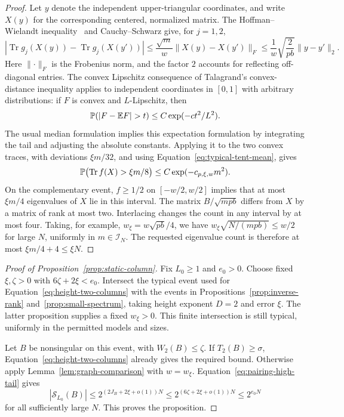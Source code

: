 \begin{proof}
Let \(y\) denote the independent upper-triangular coordinates, and
write \(X(y)\) for the corresponding centered, normalized matrix.
The Hoffman--Wielandt inequality~\cite[Theorem~1]{HoffmanWielandt}
and Cauchy--Schwarz give, for \(j=1,2\),
\[
 \left|\operatorname{Tr}g_j(X(y))-
             \operatorname{Tr}g_j(X(y'))\right|
 \le\frac{\sqrt m}{w}\lVert X(y)-X(y')\rVert_F
 \le\frac1w\sqrt{\frac2{pb}}\lVert y-y'\rVert_2.
\]
Here \(\lVert\cdot\rVert_F\) is the Frobenius norm, and the factor
\(2\) accounts for reflecting off-diagonal entries. The convex Lipschitz
consequence of Talagrand's convex-distance inequality
\cite[Theorem~4.1.1]{Talagrand} applies to independent coordinates in
\([0,1]\) with arbitrary distributions: if \(F\) is
convex and \(L\)-Lipschitz, then
\[
 \Prob(|F-\E F|>t)\le C\exp(-ct^2/L^2).
\]
The usual median formulation implies this expectation formulation by
integrating the tail and adjusting the absolute constants. Applying it
to the two convex traces, with deviations \(\xi m/32\), and using
Equation~\eqref{eq:typical-tent-mean}, gives
\[
 \mathbb P\bigl(\operatorname{Tr}f(X)>\xi m/8\bigr)
 \le C\exp(-c_{p,\xi,w}m^2).
\]
On the complementary event, \(f\ge1/2\) on \([-w/2,w/2]\) implies
that at most \(\xi m/4\) eigenvalues of \(X\) lie in this interval.
The matrix \(B/\sqrt{mpb}\) differs from \(X\) by a matrix of rank
at most two. Interlacing changes the count in any interval by at most
four. Taking, for example, \(w_\xi=w\sqrt{pb}/4\), we have
\(w_\xi\sqrt{N/(mpb)}\le w/2\) for large \(N\), uniformly in
\(m\in\mathcal I_N\). The requested eigenvalue count is therefore
at most \(\xi m/4+4\le\xi N\).
\end{proof}


\begin{proof}[Proof of Proposition~\ref{prop:static-column}]
Fix \(L_0\ge1\) and \(e_0>0\). Choose fixed \(\xi,\zeta>0\)
with \(6\zeta+2\xi<e_0\). Intersect the typical event used for
Equation~\eqref{eq:height-two-columns} with the events in
Propositions~\ref{prop:inverse-rank} and~\ref{prop:small-spectrum},
taking height exponent \(D=2\) and error \(\xi\). The latter
proposition supplies a fixed \(w_\xi>0\). This finite intersection
is still typical, uniformly in the permitted models and sizes.

Let \(B\) be nonsingular on this event, with \(W_2(B)\le\zeta\).
If \(T_2(B)\ge\sigma\), Equation~\eqref{eq:height-two-columns}
already gives the required bound. Otherwise apply
Lemma~\ref{lem:graph-comparison} with \(w=w_\xi\).
Equation~\eqref{eq:pairing-high-tail} gives
\[
 |\mathcal S_{L_0}(B)|
 \le2^{(2J_B+2\xi+o(1))N}
 \le2^{(6\zeta+2\xi+o(1))N}
 \le2^{e_0N}
\]
for all sufficiently large \(N\). This proves the proposition.
\end{proof}
